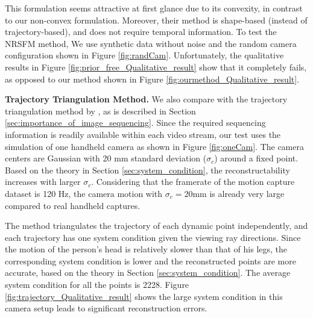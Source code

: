 This formulation seems attractive at first glance due to its convexity, in contrast to our non-convex formulation. Moreover, their method is shape-based (instead of trajectory-based), and does not require temporal information. 
To test the NRSFM method, We use synthetic data without noise and the random camera configuration shown in Figure \ref{fig:randCam}.
Unfortunately, the qualitative results in Figure \ref{fig:prior_free_Qualitative_result} show that it completely fails, as opposed to our method shown in Figure \ref{fig:ourmethod_Qualitative_result}. 


\textbf{Trajectory Triangulation Method.} We also compare with the trajectory triangulation method by  \citet{Valmadre_CVPR2012}, as is described in Section \ref{sec:importance_of_image_sequencing}. 
Since the required sequencing information is readily available within each video stream, our test uses the simulation of one handheld camera as shown in Figure \ref{fig:oneCam}. The camera centers are Gaussian with 20 mm standard deviation ($\sigma_c$) around a fixed point. %
Based on the theory in Section \ref{sec:system_condition}, the reconstructability increases with larger $\sigma_c$.
Considering that the framerate of the motion capture dataset is 120 Hz, the camera motion with  $\sigma_c = 20$mm is already very large compared to real handheld captures.

The method triangulates the trajectory of each dynamic point independently, and 
each trajectory has one system condition given the viewing ray directions. 
Since the motion of the person's head is relatively slower than that of his legs, the corresponding system condition is lower and the reconstructed points are more accurate, based on the theory in Section \ref{sec:system_condition}. 
The average system condition for all the points is 2228. 
Figure \ref{fig:trajectory_Qualitative_result} shows the large system condition in this camera setup leads to significant reconstruction errors.

